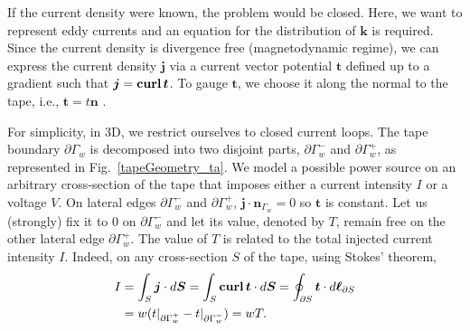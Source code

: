 \documentclass[journal]{IEEEtran}
\renewcommand{\vec}[1]{\boldsymbol{#1}} %
\newcommand{\paren}[1]{\left(#1\right)}
\newcommand{\parenangle}[1]{\left\langle#1\right\rangle}
\newcommand{\volInt}[3]{\paren{#1 \, , #2}_{#3}}
\newcommand{\surInt}[3]{\parenangle{#1 \, , #2}_{#3}}
\newcommand{\curl}{\text{\textbf{curl}}\, }
\renewcommand{\a}{\vec a}
\renewcommand{\t}{\vec t}
\newcommand{\n}{\vec n}
\newcommand{\h}{\vec h}
\newcommand{\e}{\vec e}
\renewcommand{\j}{\vec j}
\newcommand{\Oa}{\Omega_a}
\begin{document}

If the current density were known, the problem would be closed. Here, we want to represent eddy currents and an equation for the distribution of $\vec k$ is required. Since the current density is divergence free (magnetodynamic regime), we can express the current density $\j$ via a current vector potential $\vec t$ defined up to a gradient such that $\j = \curl \vec t$. To gauge $\vec t$, we choose it along the normal to the tape, i.e., $\t = t\n$ \cite{zhang2016efficient}.%

For simplicity, in 3D, we restrict ourselves to closed current loops. The tape boundary $\partial \Gamma_w$ is decomposed into two disjoint parts, $\partial\Gamma_w^-$ and $\partial\Gamma_w^+$, as represented in Fig.~\ref{tapeGeometry_ta}. We model a possible power source on an arbitrary cross-section of the tape that imposes either a current intensity $I$ or a voltage $V$.
On lateral edges $\partial\Gamma_w^-$ and $\partial\Gamma_w^+$, $\j \cdot \n_{\Gamma_w} = 0$ so $\t$ is constant. Let us (strongly) fix it to $0$ on $\partial\Gamma_w^-$ and let its value, denoted by $T$, remain free on the other lateral edge $\partial\Gamma_w^+$. The value of $T$ is related to the total injected current intensity $I$. Indeed, on any cross-section $S$ of the tape, using Stokes' theorem,
\begin{align}
I &= \int_S \vec j \cdot d\vec S = \int_S \curl \vec t \cdot d\vec S = \oint_{\partial S} \vec t \cdot d\vec \ell_{\partial S} \notag \\
&= w(t|_{\partial\Gamma_w^+} - t|_{\partial\Gamma_w^-}) = wT.
\end{align}
\end{document}
